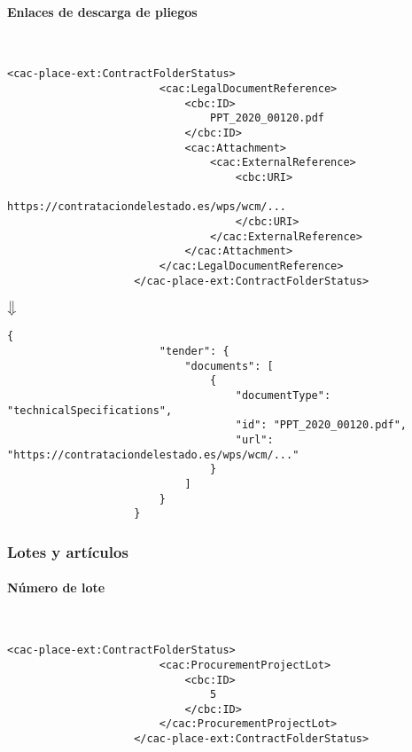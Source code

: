             \paragraph{Enlaces de descarga de pliegos} \mbox{}\\
                \begin{lstlisting}[language=lXML]
                    <cac-place-ext:ContractFolderStatus>
                        <cac:LegalDocumentReference>
                            <cbc:ID>
                                PPT_2020_00120.pdf
                            </cbc:ID>
                            <cac:Attachment>
                                <cac:ExternalReference>
                                    <cbc:URI>
                                        https://contrataciondelestado.es/wps/wcm/...
                                    </cbc:URI>
                                </cac:ExternalReference>
                            </cac:Attachment>
                        </cac:LegalDocumentReference>
                    </cac-place-ext:ContractFolderStatus>
                \end{lstlisting}
                
                \begin{center}
                    $\big\Downarrow$
                \end{center}
\newpage
                \begin{lstlisting}[language=lJSON]
                    {
                        "tender": {
                            "documents": [
                                {
                                    "documentType": "technicalSpecifications",
                                    "id": "PPT_2020_00120.pdf",
                                    "url": "https://contrataciondelestado.es/wps/wcm/..."
                                }
                            ]
                        }
                    }
                \end{lstlisting}
                
        \subsubsection{Lotes y artículos}
            \paragraph{Número de lote} \mbox{}\\
                \begin{lstlisting}[language=lXML]
                    <cac-place-ext:ContractFolderStatus>
                        <cac:ProcurementProjectLot>
                            <cbc:ID>
                                5
                            </cbc:ID>
                        </cac:ProcurementProjectLot>
                    </cac-place-ext:ContractFolderStatus>
                \end{lstlisting}
                
